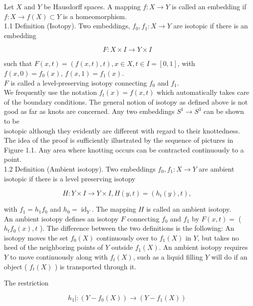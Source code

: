 \documentclass[10pt, letterpaper]{article}
\begin{document}
Let $X$ and $Y$ be Hausdorff spaces. A mapping $f: X \rightarrow Y$ is called an embedding if $f: X \rightarrow f(X) \subset Y$ is a homeomorphism.\\
1.1 Definition (Isotopy). Two embeddings, $f_{0}, f_{1}: X \rightarrow Y$ are isotopic if there is an embedding

$$
F: X \times I \rightarrow Y \times I
$$

such that $F(x, t)=(f(x, t), t), x \in X, t \in I=[0,1]$, with $f(x, 0)=f_{0}(x)$, $f(x, 1)=f_{1}(x)$.\\
$F$ is called a level-preserving isotopy connecting $f_{0}$ and $f_{1}$.\\
We frequently use the notation $f_{t}(x)=f(x, t)$ which automatically takes care of the boundary conditions. The general notion of isotopy as defined above is not good as far as knots are concerned. Any two embeddings $S^{1} \rightarrow S^{3}$ can be shown to be\\
isotopic although they evidently are different with regard to their knottedness. The idea of the proof is sufficiently illustrated by the sequence of pictures in Figure 1.1. Any area where knotting occurs can be contracted continuously to a point.\\
1.2 Definition (Ambient isotopy). Two embeddings $f_{0}, f_{1}: X \rightarrow Y$ are ambient isotopic if there is a level preserving isotopy

$$
H: Y \times I \rightarrow Y \times I, H(y, t)=\left(h_{t}(y), t\right),
$$

with $f_{1}=h_{1} f_{0}$ and $h_{0}=\operatorname{id}_{Y}$. The mapping $H$ is called an ambient isotopy.\\
An ambient isotopy defines an isotopy $F$ connecting $f_{0}$ and $f_{1}$ by $F(x, t)=$ ( $h_{t} f_{0}(x), t$ ). The difference between the two definitions is the following: An isotopy moves the set $f_{0}(X)$ continuously over to $f_{1}(X)$ in $Y$, but takes no heed of the neighboring points of $Y$ outside $f_{1}(X)$. An ambient isotopy requires $Y$ to move continuously along with $f_{t}(X)$, such as a liquid filling $Y$ will do if an object ( $f_{t}(X)$ ) is transported through it.

The restriction

$$
h_{1} \mid:\left(Y-f_{0}(X)\right) \rightarrow\left(Y-f_{1}(X)\right)
$$
\end{document}
